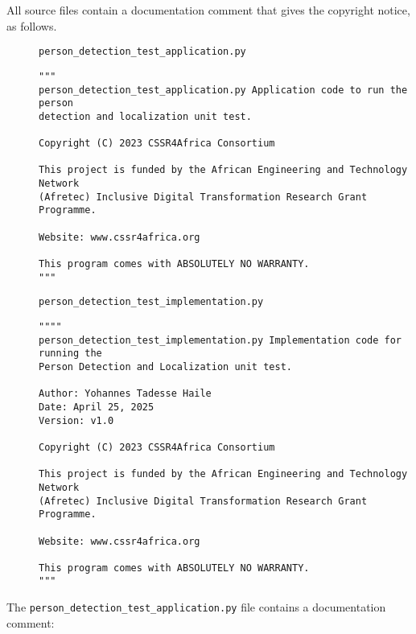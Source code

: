\documentclass{CSSRforAfrica}
\newcommand{\blank}{~\\}
\newcommand{\checkboxChecked}{\fbox{\ding{51}}} %
\begin{document}
\noindent All source files contain a documentation comment that gives the copyright notice, as follows.
 
\begin{description}

\item[\checkboxChecked] {\small \verb+person_detection_test_application.py+}  
{\small \begin{verbatim}
"""
person_detection_test_application.py Application code to run the person 
detection and localization unit test.

Copyright (C) 2023 CSSR4Africa Consortium

This project is funded by the African Engineering and Technology Network 
(Afretec) Inclusive Digital Transformation Research Grant Programme.

Website: www.cssr4africa.org

This program comes with ABSOLUTELY NO WARRANTY.
"""
\end{verbatim} }

\newpage
\item[\checkboxChecked]  {\small \verb+person_detection_test_implementation.py+}  
{\small \begin{verbatim}
""""
person_detection_test_implementation.py Implementation code for running the 
Person Detection and Localization unit test.

Author: Yohannes Tadesse Haile
Date: April 25, 2025
Version: v1.0

Copyright (C) 2023 CSSR4Africa Consortium

This project is funded by the African Engineering and Technology Network 
(Afretec) Inclusive Digital Transformation Research Grant Programme.

Website: www.cssr4africa.org

This program comes with ABSOLUTELY NO WARRANTY.
"""
\end{verbatim} }

\end{description} 

\noindent The {\small \verb+person_detection_test_application.py+} file contains a documentation comment:
\end{document}

